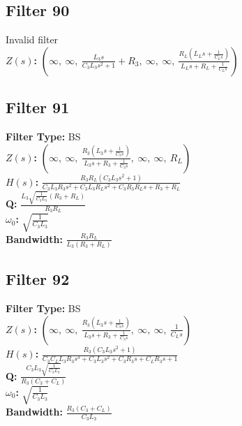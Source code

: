 \documentclass{article}
\begin{document}
\subsection*{Filter 90}
Invalid filter \\ 
\textbf{$Z(s)$:} $\left( \infty, \  \infty, \  \frac{L_{3} s}{C_{3} L_{3} s^{2} + 1} + R_{3}, \  \infty, \  \infty, \  \frac{R_{L} \left(L_{L} s + \frac{1}{C_{L} s}\right)}{L_{L} s + R_{L} + \frac{1}{C_{L} s}}\right)$ \\ 
\subsection*{Filter 91}
\textbf{Filter Type:} BS \\ 
\textbf{$Z(s)$:} $\left( \infty, \  \infty, \  \frac{R_{3} \left(L_{3} s + \frac{1}{C_{3} s}\right)}{L_{3} s + R_{3} + \frac{1}{C_{3} s}}, \  \infty, \  \infty, \  R_{L}\right)$ \\ 
\textbf{$H(s)$:} $\frac{R_{3} R_{L} \left(C_{3} L_{3} s^{2} + 1\right)}{C_{3} L_{3} R_{3} s^{2} + C_{3} L_{3} R_{L} s^{2} + C_{3} R_{3} R_{L} s + R_{3} + R_{L}}$ \\ 
\textbf{Q:} $\frac{L_{3} \sqrt{\frac{1}{C_{3} L_{3}}} \left(R_{3} + R_{L}\right)}{R_{3} R_{L}}$ \\ 
\textbf{$\omega_0$:} $\sqrt{\frac{1}{C_{3} L_{3}}}$ \\ 
\textbf{Bandwidth:} $\frac{R_{3} R_{L}}{L_{3} \left(R_{3} + R_{L}\right)}$ \\ 
\subsection*{Filter 92}
\textbf{Filter Type:} BS \\ 
\textbf{$Z(s)$:} $\left( \infty, \  \infty, \  \frac{R_{3} \left(L_{3} s + \frac{1}{C_{3} s}\right)}{L_{3} s + R_{3} + \frac{1}{C_{3} s}}, \  \infty, \  \infty, \  \frac{1}{C_{L} s}\right)$ \\ 
\textbf{$H(s)$:} $\frac{R_{3} \left(C_{3} L_{3} s^{2} + 1\right)}{C_{3} C_{L} L_{3} R_{3} s^{3} + C_{3} L_{3} s^{2} + C_{3} R_{3} s + C_{L} R_{3} s + 1}$ \\ 
\textbf{Q:} $\frac{C_{3} L_{3} \sqrt{\frac{1}{C_{3} L_{3}}}}{R_{3} \left(C_{3} + C_{L}\right)}$ \\ 
\textbf{$\omega_0$:} $\sqrt{\frac{1}{C_{3} L_{3}}}$ \\ 
\textbf{Bandwidth:} $\frac{R_{3} \left(C_{3} + C_{L}\right)}{C_{3} L_{3}}$ \\ 
\end{document}

